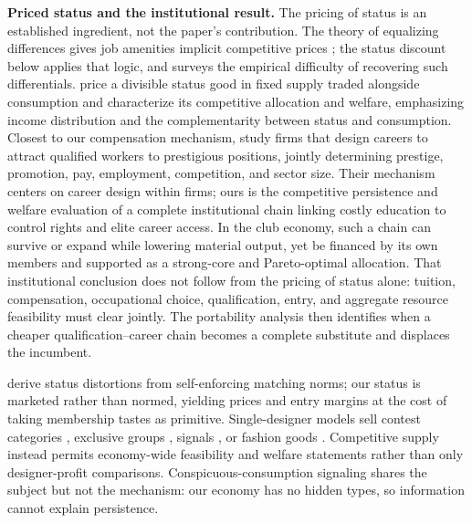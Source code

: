 \documentclass[12pt,letterpaper]{article}
\theoremstyle{definition}
\begin{document}
\textbf{Priced status and the institutional result.}
The pricing of status is an established ingredient, not the paper's contribution.
The theory of equalizing differences gives job amenities implicit competitive prices
\citep{rosen1974hedonic,rosen1986equalizing}; the status discount below applies that
logic, and \citet{lavetti2023compensating} surveys the empirical difficulty of recovering
such differentials.
\citet{beckermurphywerning2005} price a divisible status good in fixed supply traded
alongside consumption and characterize its competitive allocation and welfare,
emphasizing income distribution and the complementarity between status and consumption.
Closest to our compensation mechanism, \citet{ferreiranikolowa2024} study firms that
design careers to attract qualified workers to prestigious positions, jointly determining
prestige, promotion, pay, employment, competition, and sector size.
Their mechanism centers on career design within firms; ours is the competitive
persistence and welfare evaluation of a complete institutional chain linking costly
education to control rights and elite career access.
In the club economy, such a chain can survive or expand while lowering material output,
yet be financed by its own members and supported as a strong-core and Pareto-optimal
allocation.
That institutional conclusion does not follow from the pricing of status alone: tuition,
compensation, occupational choice, qualification, entry, and aggregate resource
feasibility must clear jointly.
The portability analysis then identifies when a cheaper qualification--career chain
becomes a complete substitute and displaces the incumbent.

\citet{colemailathpostlewaite1992} derive status distortions from self-enforcing matching
norms; our status is marketed rather than normed, yielding prices and entry margins at the
cost of taking membership tastes as primitive.
Single-designer models sell contest categories \citep{moldovanuselashi2007}, exclusive
groups \citep{board2009group}, signals \citep{rayo2013signal}, or fashion goods
\citep{pesendorfer1995fashion}.
Competitive supply instead permits economy-wide feasibility and welfare statements
rather than only designer-profit comparisons.
Conspicuous-consumption signaling \citep{bagwellbernheim1996veblen} shares the subject
but not the mechanism: our economy has no hidden types, so information cannot explain
persistence.
\end{document}
